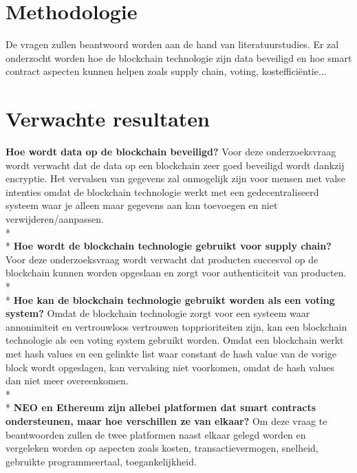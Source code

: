 \documentclass[fleqn,10pt]{voorstel}
\begin{document}
\section{Methodologie}
\label{sec:methodologie}

De vragen zullen beantwoord worden aan de hand van literatuurstudies. Er zal onderzocht worden hoe de blockchain technologie zijn data beveiligd en hoe smart contract aspecten kunnen helpen zoals supply chain, voting, kostefficiëntie...

\section{Verwachte resultaten}
\label{sec:verwachte_resultaten}

\textbf{Hoe wordt data op de blockchain beveiligd?} Voor deze onderzoeksvraag wordt verwacht dat de data op een blockchain zeer goed beveiligd wordt dankzij encryptie. Het vervalsen van gegevens zal onmogelijk zijn voor mensen met valse intenties omdat de blockchain technologie werkt met een gedecentraliseerd systeem waar je alleen maar gegevens aan kan toevoegen en niet verwijderen/aanpassen.\\*\\*
\textbf{Hoe wordt de blockchain technologie gebruikt voor supply chain?} Voor deze onderzoeksvraag wordt verwacht dat producten succesvol op de blockchain kunnen worden opgeslaan en zorgt voor authenticiteit van producten.\\*\\*
\textbf{Hoe kan de blockchain technologie gebruikt worden als een voting system?} Omdat de blockchain technologie zorgt voor een systeem waar annonimiteit en vertrouwloos vertrouwen topprioriteiten zijn, kan een blockchain technologie als een voting system gebruikt worden. Omdat een blockchain werkt met hash values en een gelinkte list waar constant de hash value van de vorige block wordt opgeslagen, kan vervalsing niet voorkomen, omdat de hash values dan niet meer overeenkomen.\\*\\*
\textbf{NEO en Ethereum zijn allebei platformen dat smart contracts ondersteunen, maar hoe verschillen ze van elkaar?} Om deze vraag te beantwoorden zullen de twee platformen naast elkaar gelegd worden en vergeleken worden op aspecten zoals kosten, transactievermogen, snelheid, gebruikte programmeertaal, toegankelijkheid.
\end{document}
